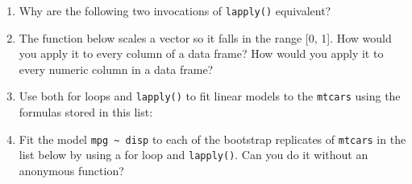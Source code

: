 \begin{enumerate}
\def\labelenumi{\arabic{enumi}.}
\item
  Why are the following two invocations of \texttt{lapply()} equivalent?

\begin{Shaded}
\begin{Highlighting}[]
\StringTok{ }\NormalTok{(}\NormalTok{, }\NormalTok{, }\NormalTok{, }\NormalTok{)}
\StringTok{ }\NormalTok{(}\NormalTok{)}

\end{Highlighting}
\end{Shaded}
\item
  The function below scales a vector so it falls in the range {[}0,
  1{]}. How would you apply it to every column of a data frame? How
  would you apply it to every numeric column in a data frame?

\begin{Shaded}
\begin{Highlighting}[]
\StringTok{ }
\StringTok{ } \NormalTok{)}
\OperatorTok{-}\StringTok{ }\NormalTok{rng[}\NormalTok{]) }\OperatorTok{/}\StringTok{ }\NormalTok{(rng[}\NormalTok{] }\OperatorTok{-}\StringTok{ }\NormalTok{rng[}\NormalTok{])}
\NormalTok{\}}
\end{Highlighting}
\end{Shaded}
\item
  Use both for loops and \texttt{lapply()} to fit linear models to the
  \texttt{mtcars} using the formulas stored in this list:

\begin{Shaded}
\begin{Highlighting}[]
\StringTok{ }\NormalTok{(}
\OperatorTok{~}\StringTok{ }
\OperatorTok{~}\StringTok{ }\NormalTok{(} \OperatorTok{/}\StringTok{ }
\OperatorTok{~}\StringTok{ }\OperatorTok{+}\StringTok{ }
\OperatorTok{~}\StringTok{ }\NormalTok{(} \OperatorTok{/}\StringTok{ }\OperatorTok{+}\StringTok{ }
\NormalTok{)}
\end{Highlighting}
\end{Shaded}
\item
  Fit the model \texttt{mpg\ \textasciitilde{}\ disp} to each of the
  bootstrap replicates of \texttt{mtcars} in the list below by using a
  for loop and \texttt{lapply()}. Can you do it without an anonymous
  function?


\end{enumerate}
